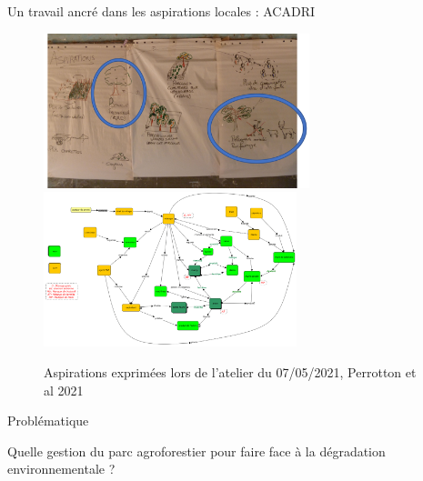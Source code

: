 \documentclass[aspectratio=169]{beamer}
\begin{document}
\begin{frame}{Un travail ancré dans les aspirations locales : ACADRI}
    \begin{center}
        \vspace{-1em}
        \begin{figure}
            \centering
            \includegraphics[height = 4.5cm]{img/photoAspiration.png}~
            \includegraphics[height = 4.5cm]{img/modeleConceptuel.png}
            \caption{Aspirations exprimées lors de l’atelier du 07/05/2021, Perrotton et al 2021 }
        \end{figure}
    \end{center}
\end{frame}



\begin{frame}{Problématique}
    \begin{center}
        \large{Quelle gestion du parc agroforestier pour faire face à la dégradation environnementale ?}
    \end{center}
\end{frame}
\end{document}
